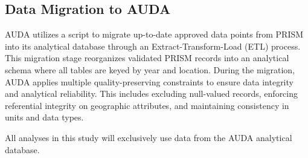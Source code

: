 \subsection{Data Migration to AUDA}

AUDA utilizes a script to migrate up-to-date approved data points from PRISM into its analytical database through an Extract-Transform-Load (ETL) process. This migration stage reorganizes validated PRISM records into an analytical schema where all tables are keyed by year and location. During the migration, AUDA applies multiple quality-preserving constraints to ensure data integrity and analytical reliability. This includes excluding null-valued records, enforcing referential integrity on geographic attributes, and maintaining consistency in units and data types.

All analyses in this study will exclusively use data from the AUDA analytical database.
